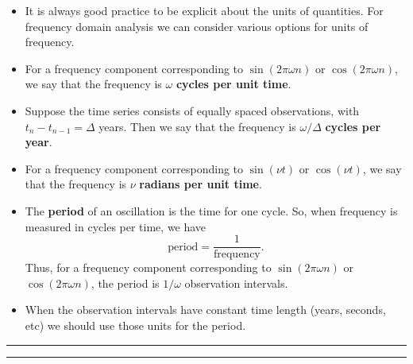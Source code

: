 \documentclass[]{article}
\begin{document}
\begin{itemize}
\item
  It is always good practice to be explicit about the units of
  quantities. For frequency domain analysis we can consider various
  options for units of frequency.
\item
  For a frequency component corresponding to \(\sin(2\pi\omega n)\) or
  \(\cos(2\pi\omega n)\), we say that the frequency is \(\omega\)
  \textbf{cycles per unit time}.
\item
  Suppose the time series consists of equally spaced observations, with
  \(t_{n}-t_{n-1}=\Delta\) years. Then we say that the frequency is
  \(\omega/\Delta\) \textbf{cycles per year}.
\item
  For a frequency component corresponding to \(\sin(\nu t)\) or
  \(\cos(\nu t)\), we say that the frequency is \(\nu\) \textbf{radians
  per unit time}.
\item
  The \textbf{period} of an oscillation is the time for one cycle. So,
  when frequency is measured in cycles per time, we have
  \[ \mbox{period} = \frac{1}{\mbox{frequency}}.\] Thus, for a frequency
  component corresponding to \(\sin(2\pi\omega n)\) or
  \(\cos(2\pi\omega n)\), the period is \(1/\omega\) observation
  intervals.
\item
  When the observation intervals have constant time length (years,
  seconds, etc) we should use those units for the period.
\end{itemize}

\begin{center}\rule{0.5\linewidth}{\linethickness}\end{center}

\begin{center}\rule{0.5\linewidth}{\linethickness}\end{center}
\end{document}
